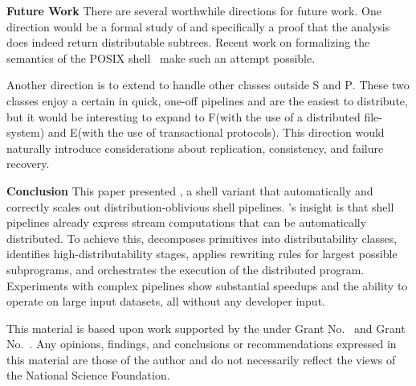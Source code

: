 \documentclass[sigplan,10pt,review,anonymous]{acmart}
\newcommand{\heading}[1]{\vspace{4pt}\noindent\textbf{#1}\enspace}
\newcommand{\cn}[1]{\mbox{\textcircled{\footnotesize #1}}}
\newcommand{\pur}{\cn{\textsc{P}}\xspace}
\newcommand{\sta}{\cn{\textsc{S}}\xspace}
\newcommand{\dfs}{\cn{\textsc{F}}\xspace}
\newcommand{\sid}{\cn{\textsc{E}}\xspace}
\newcommand{\kk}[1]{[{\color{magenta}#1 --- kk}]}
\begin{document}
\heading{Future Work}
There are several worthwhile directions for future work.
One direction would be a formal study of \sys and specifically a proof that the analysis~ does indeed return distributable subtrees.
Recent work on formalizing the semantics of the POSIX shell~\cite{smoosh:20} make such an attempt possible.

Another direction is to extend \sys to handle other classes outside \sta and \pur.
These two classes enjoy a certain in quick, one-off pipelines and are the easiest to distribute, but 
it would be interesting to expand to \dfs (with the use of a distributed file-system) and \sid (with the use of transactional protocols).
This direction would naturally introduce considerations about replication, consistency, and failure recovery.


\heading{Conclusion}
This paper presented \sys, a shell variant that automatically and correctly scales out distribution-oblivious shell pipelines. 
\sys's insight is that shell pipelines already express stream computations that can be automatically distributed.
To achieve this, \sys
  decomposes primitives into distributability classes,
  identifies high-distributability stages,
  applies rewriting rules for largest possible subprograms,
  and orchestrates the execution of the distributed program.
Experiments with complex pipelines show substantial speedups and the ability to operate on large input datasets, all without any developer input.

\begin{acks}
  This material is based upon work supported by the
   under Grant
  No.~ and Grant
  No.~.  Any opinions, findings, and
  conclusions or recommendations expressed in this material are those
  of the author and do not necessarily reflect the views of the
  National Science Foundation.
\end{acks}
\end{document}
